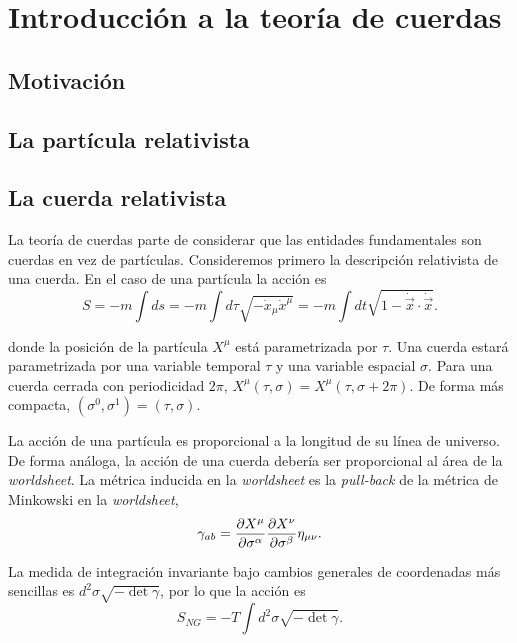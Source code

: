 \chapter{Introducción a la teoría de cuerdas}


\section{Motivación}


\section{La partícula relativista}


\section{La cuerda relativista}


La teoría de cuerdas parte de considerar que las entidades fundamentales son cuerdas
en vez de partículas. 
Consideremos primero la descripción relativista de una cuerda. En el caso de una
partícula la acción es
\begin{equation}
  S=-m\int ds = -m\int d\tau \sqrt{-\dot{x}_\mu\dot{x}^\mu}=-m\int dt \sqrt{1-\dot {\vec{x}} \cdot \dot {\vec{x}}}.
\end{equation}

donde la posición de la partícula $X^\mu$ está parametrizada por $\tau$.
Una cuerda estará parametrizada por una variable temporal $\tau$ y una variable espacial $\sigma$.
Para una cuerda cerrada con periodicidad $2\pi$, $X^\mu(\tau,\sigma)=X^\mu(\tau,\sigma+2\pi)$.
De forma más compacta, $(\sigma^0,\sigma^1)=(\tau,\sigma)$.

La acción de una partícula es proporcional a la longitud de su línea de universo.
De forma análoga, la acción de una cuerda debería ser proporcional al área de la
\emph{worldsheet}. 
La métrica inducida en la \emph{worldsheet} es la \emph{pull-back} de la métrica de Minkowski
en la \emph{worldsheet},
\begin{equation}
  \gamma_{ab}=\pdv{X^\mu}{\sigma^\alpha}\pdv{X^\nu}{\sigma^\beta}\eta_{\mu\nu}.
\end{equation}

La medida de integración invariante bajo cambios generales de coordenadas más sencillas 
es $d^2\sigma \sqrt{-\det\gamma}$, por lo que la acción es
\begin{equation}
  S_{NG}=-T\int d^2\sigma \sqrt{-\det\gamma}.
\end{equation}

